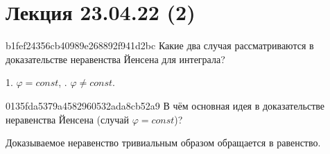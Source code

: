 \section{Лекция 23.04.22 (2)}

\begin{note}{b1fef24356cb40989e268892f941d2bc}
    Какие два случая рассматриваются в доказательстве неравенства Йенсена для интеграла?

    \begin{cloze}{1}
        \begin{center}
            1.\: \({ \varphi =  const }\), .\: \({ \varphi \neq const }\).
        \end{center}
    \end{cloze}
\end{note}

\begin{note}{0135fda5379a4582960532ada8cb52a9}
    В чём основная идея в доказательстве неравенства Йенсена (случай \({ \varphi = const }\))?

    \begin{cloze}{1}
       Доказываемое неравенство тривиальным образом обращается в равенство.
    \end{cloze}
\end{note}

